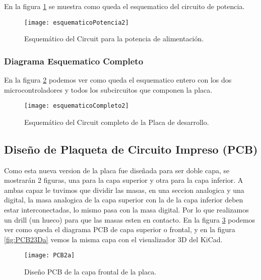 En la figura \ref{fig:esquematicoPotencia2} se muestra como queda el esquematico del circuito de potencia.

\begin{figure}[H] 
\centering
  \texttt{[image: esquematicoPotencia2]}
  \caption{Esquemático del Circuit para la potencia de alimentación.}\label{fig:esquematicoPotencia2}
\end{figure}


\subsubsection{Diagrama Esquematico Completo}
\label{subsubsection: esquematico_completo2}

En la figura \ref{fig:esquematicoCompleto2} podemos ver como queda el esquematico entero con los dos microcontroladores y todos los subcircuitos que componen la placa.

\begin{figure}  
\centering
  \texttt{[image: esquematicoCompleto2]}
  \caption{Esquemático del Circuit completo de la Placa de desarrollo.}\label{fig:esquematicoCompleto2}
\end{figure}




\subsection{Diseño de Plaqueta de Circuito Impreso (PCB)}
\label{ subsection: diseño_pcb2}

Como esta nueva version de la placa fue diseñada para ser doble capa, se mostrarán 2 figuras, una para la capa superior y otra para la capa inferior. 
A ambas capaz le tuvimos que dividir las masas, en una seccion analogica y una digital, la masa analogica de la capa superior con la de la capa inferior deben estar interconectadas, lo mismo pasa con la masa digital. Por lo que realizamos un drill (un hueco) para que las masas esten en contacto.
En la figura \ref{fig:PCB2a} podemos ver como queda el diagrama PCB de capa superior o frontal, y en la figura \ref{fig:PCB23Da} vemos la misma capa con el visualizador 3D del KiCad.

\begin{figure}[H]
\centering
  \texttt{[image: PCB2a]}
  \caption{Diseño PCB de la capa frontal de la placa.}\label{fig:PCB2a}
\end{figure}

